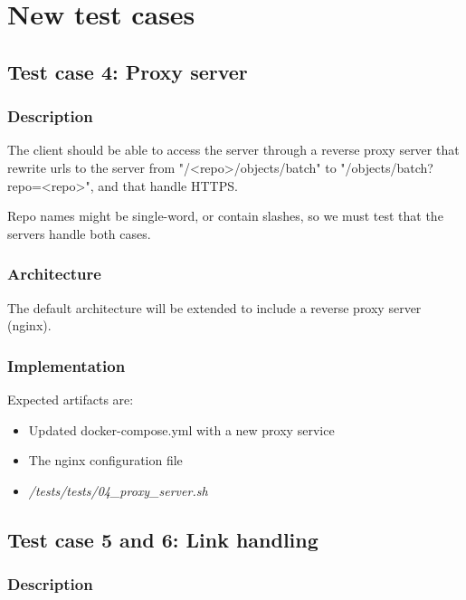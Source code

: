 \section{New test cases}

\subsection{Test case 4: Proxy server}

\subsubsection{Description}

The client should be able to access the server through a reverse proxy server that rewrite urls to the server from "/<repo>/objects/batch" to "/objects/batch?repo=<repo>", and that handle HTTPS.

Repo names might be single-word, or contain slashes, so we must test that the servers handle both cases.

\subsubsection{Architecture}

The default architecture will be extended to include a reverse proxy server (nginx).

\subsubsection{Implementation}

Expected artifacts are:

\begin{itemize}
    \item Updated docker-compose.yml with a new proxy service
    \item The nginx configuration file
    \item \textit{/tests/tests/04\_proxy\_server.sh}
\end{itemize}

\subsection{Test case 5 and 6: Link handling}

\subsubsection{Description}

